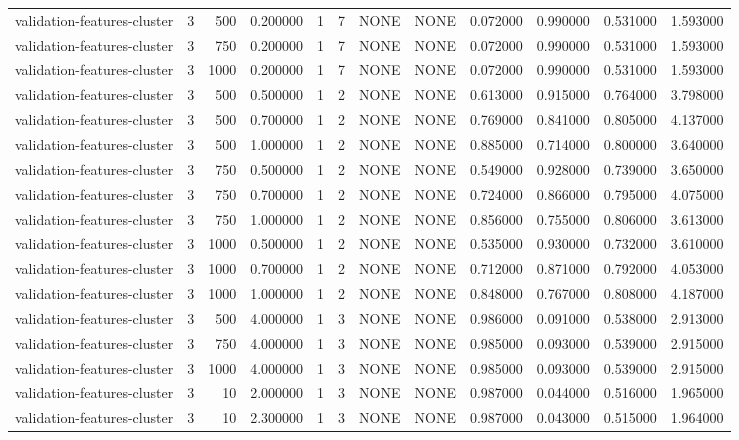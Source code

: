 \begin{tabular}{lrrrllllrrrr}
validation-features-cluster & 3 & 500 & 0.200000 & 1 & 7 & NONE & NONE & 0.072000 & 0.990000 & 0.531000 & 1.593000 \\
validation-features-cluster & 3 & 750 & 0.200000 & 1 & 7 & NONE & NONE & 0.072000 & 0.990000 & 0.531000 & 1.593000 \\
validation-features-cluster & 3 & 1000 & 0.200000 & 1 & 7 & NONE & NONE & 0.072000 & 0.990000 & 0.531000 & 1.593000 \\
validation-features-cluster & 3 & 500 & 0.500000 & 1 & 2 & NONE & NONE & 0.613000 & 0.915000 & 0.764000 & 3.798000 \\
validation-features-cluster & 3 & 500 & 0.700000 & 1 & 2 & NONE & NONE & 0.769000 & 0.841000 & 0.805000 & 4.137000 \\
validation-features-cluster & 3 & 500 & 1.000000 & 1 & 2 & NONE & NONE & 0.885000 & 0.714000 & 0.800000 & 3.640000 \\
validation-features-cluster & 3 & 750 & 0.500000 & 1 & 2 & NONE & NONE & 0.549000 & 0.928000 & 0.739000 & 3.650000 \\
validation-features-cluster & 3 & 750 & 0.700000 & 1 & 2 & NONE & NONE & 0.724000 & 0.866000 & 0.795000 & 4.075000 \\
validation-features-cluster & 3 & 750 & 1.000000 & 1 & 2 & NONE & NONE & 0.856000 & 0.755000 & 0.806000 & 3.613000 \\
validation-features-cluster & 3 & 1000 & 0.500000 & 1 & 2 & NONE & NONE & 0.535000 & 0.930000 & 0.732000 & 3.610000 \\
validation-features-cluster & 3 & 1000 & 0.700000 & 1 & 2 & NONE & NONE & 0.712000 & 0.871000 & 0.792000 & 4.053000 \\
validation-features-cluster & 3 & 1000 & 1.000000 & 1 & 2 & NONE & NONE & 0.848000 & 0.767000 & 0.808000 & 4.187000 \\
validation-features-cluster & 3 & 500 & 4.000000 & 1 & 3 & NONE & NONE & 0.986000 & 0.091000 & 0.538000 & 2.913000 \\
validation-features-cluster & 3 & 750 & 4.000000 & 1 & 3 & NONE & NONE & 0.985000 & 0.093000 & 0.539000 & 2.915000 \\
validation-features-cluster & 3 & 1000 & 4.000000 & 1 & 3 & NONE & NONE & 0.985000 & 0.093000 & 0.539000 & 2.915000 \\
validation-features-cluster & 3 & 10 & 2.000000 & 1 & 3 & NONE & NONE & 0.987000 & 0.044000 & 0.516000 & 1.965000 \\
validation-features-cluster & 3 & 10 & 2.300000 & 1 & 3 & NONE & NONE & 0.987000 & 0.043000 & 0.515000 & 1.964000 \\

\end{tabular}
